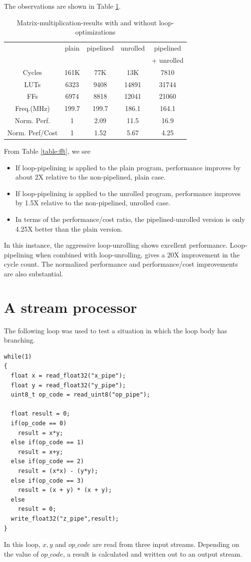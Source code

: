 \documentclass[conference]{IEEEtran}
\begin{document}
The observations are shown in Table \ref{table:mmultiply}.
\begin{table}[htb]
  \centering
  \caption{Matrix-multiplication-results  with and without loop-optimizations}
  \label{table:mmultiply}
  \renewcommand\arraystretch{1.2}
  \setlength{\tabcolsep}{1ex}
  \begin{tabular}{c|c|c|c|c}
  \hline
  & plain & pipelined & unrolled & pipelined  \\
  &       &           &          & + unrolled\\
  \hline

Cycles   &    161K  &   77K   &     13K  &     7810 \\
LUTs     &   6323   &  9408  &     14891  &    31744 \\
FFs      &    6974  &  8818  &     12041  &    21060 \\
Freq.(MHz)  & 199.7  &   199.7 &   186.1 &    164.1 \\
Norm. Perf. & 1      &  2.09  & 11.5 & 16.9 \\
Norm. Perf/Cost & 1  &  1.52  & 5.67 & 4.25 \\
\hline
  \end{tabular}
\end{table}
From Table \ref{table:fft}, we see 
\begin{itemize}
\item If loop-pipelining is 
applied to the plain program, performance improves
by about 2X relative to the non-pipelined, plain case.
\item If loop-pipelining is applied to the unrolled program,
performance improves by 1.5X relative to the non-pipelined,
unrolled case.  
\item In terms of the performance/cost
ratio, the pipelined-unrolled version is only 4.25X better than
the plain version.   
\end{itemize}
In this instance, the aggressive loop-unrolling shows
excellent performance.  Loop-pipelining when combined with loop-unrolling,
gives a 20X improvement in the cycle count.  The normalized
performance and performance/cost improvements are also substantial.

\section{A stream processor}

The following loop was used to test a situation in
which the loop body has branching.  
\begin{verbatim}
while(1)
{
  float x = read_float32("x_pipe");
  float y = read_float32("y_pipe");
  uint8_t op_code = read_uint8("op_pipe");

  float result = 0;
  if(op_code == 0)
    result = x*y;
  else if(op_code == 1)
    result = x+y;
  else if(op_code == 2)
    result = (x*x) - (y*y);
  else if(op_code == 3)
    result = (x + y) * (x + y);
  else
    result = 0;
  write_float32("z_pipe",result);
}
\end{verbatim}
In this loop, $x,y$ and $op\_code$ are read from
three input streams.  Depending on the value of
$op\_code$, a result is calculated and written out
to an output stream.
\end{document}

